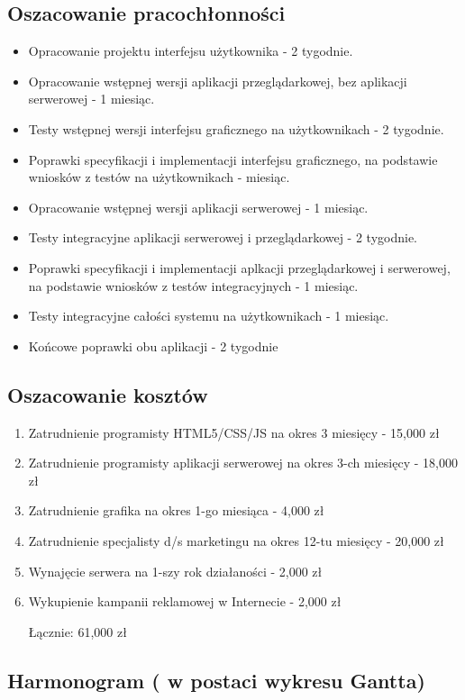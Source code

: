 \documentclass[12pt,a4paper]{report}
\begin{document}
\subsection{Oszacowanie pracochłonności}
\begin{itemize}
	\item Opracowanie projektu interfejsu użytkownika - 2 tygodnie.
	\item Opracowanie wstępnej wersji aplikacji przeglądarkowej, bez aplikacji serwerowej - 1 miesiąc.
	\item Testy wstępnej wersji interfejsu graficznego na użytkownikach - 2 tygodnie.
	\item Poprawki specyfikacji i implementacji interfejsu graficznego, na podstawie wniosków z testów na użytkownikach - miesiąc.
	\item Opracowanie wstępnej wersji aplikacji serwerowej - 1 miesiąc.
	\item Testy integracyjne aplikacji serwerowej i przeglądarkowej - 2 tygodnie.
	\item Poprawki specyfikacji i implementacji aplkacji przeglądarkowej i serwerowej, na podstawie wniosków z testów integracyjnych - 1 miesiąc.
	\item Testy integracyjne całości systemu na użytkownikach - 1 miesiąc.
	\item Końcowe poprawki obu aplikacji - 2 tygodnie 
\end{itemize}
\subsection{Oszacowanie kosztów}
\begin{enumerate}
	\item Zatrudnienie programisty HTML5/CSS/JS na okres 3 miesięcy - 15,000 zł
	\item Zatrudnienie programisty aplikacji serwerowej na okres 3-ch miesięcy - 18,000 zł
	\item Zatrudnienie grafika na okres 1-go miesiąca - 4,000 zł
	\item Zatrudnienie specjalisty d/s marketingu na okres 12-tu miesięcy - 20,000 zł
	\item Wynajęcie serwera na 1-szy rok działaności - 2,000 zł
	\item Wykupienie kampanii reklamowej w Internecie - 2,000 zł

Łącznie: 61,000 zł
\end{enumerate}
\subsection{Harmonogram ( w postaci wykresu Gantta)}
\end{document}
